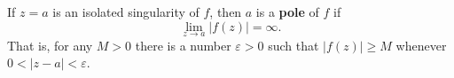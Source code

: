 If $z = a$ is an isolated singularity of $f$, then $a$ is a \textbf{pole} of $f$ if
$$\lim_{z \to a} |f(z)| = \infty.$$
That is, for any $M > 0$ there is a number $\varepsilon > 0$ such that $|f(z)| \geq M$ whenever $0 < |z-a| < \varepsilon$.
